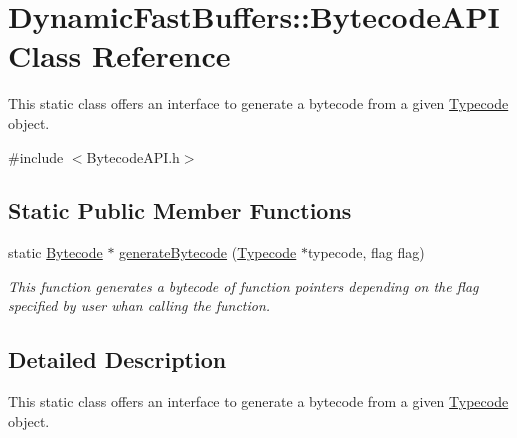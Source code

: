 \hypertarget{class_dynamic_fast_buffers_1_1_bytecode_a_p_i}{\section{Dynamic\-Fast\-Buffers\-:\-:Bytecode\-A\-P\-I Class Reference}
\label{class_dynamic_fast_buffers_1_1_bytecode_a_p_i}
}


This static class offers an interface to generate a bytecode from a given \hyperlink{class_dynamic_fast_buffers_1_1_typecode}{Typecode} object.  




{\ttfamily \#include $<$Bytecode\-A\-P\-I.\-h$>$}

\subsection*{Static Public Member Functions}
\begin{DoxyCompactItemize}
\item 
static \hyperlink{class_dynamic_fast_buffers_1_1_bytecode}{Bytecode} $\ast$ \hyperlink{class_dynamic_fast_buffers_1_1_bytecode_a_p_i_a082121e1283ca0ae9a456caf814c0be8}{generate\-Bytecode} (\hyperlink{class_dynamic_fast_buffers_1_1_typecode}{Typecode} $\ast$typecode, flag flag)
\begin{DoxyCompactList}\small\item\em This function generates a bytecode of function pointers depending on the flag specified by user whan calling the function. \end{DoxyCompactList}\end{DoxyCompactItemize}


\subsection{Detailed Description}
This static class offers an interface to generate a bytecode from a given \hyperlink{class_dynamic_fast_buffers_1_1_typecode}{Typecode} object. 

